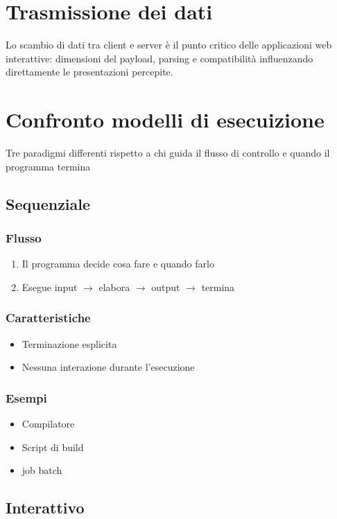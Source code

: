 \section{Trasmissione dei dati}
Lo scambio di dati tra client e server è il punto critico delle applicazioni web interattive: dimensioni del payload, parsing e compatibilità influenzando direttamente le presentazioni percepite.

\newpage
\section{Confronto modelli di esecuizione}
Tre paradigmi differenti rispetto a chi guida il flusso di controllo e quando il programma termina

\subsection{Sequenziale}
\subsubsection{Flusso}
\begin{enumerate}
    \item Il programma decide cosa fare e quando farlo
    \item Esegue input $\to$ elabora $\to$ output $\to$ termina
\end{enumerate}
\subsubsection{Caratteristiche}
\begin{itemize}
    \item Terminazione esplicita
    \item Nessuna interazione durante l'esecuzione
\end{itemize}
\subsubsection{Esempi}
\begin{itemize}
    \item Compilatore
    \item Script di build
    \item job batch
\end{itemize}

\subsection{Interattivo}
